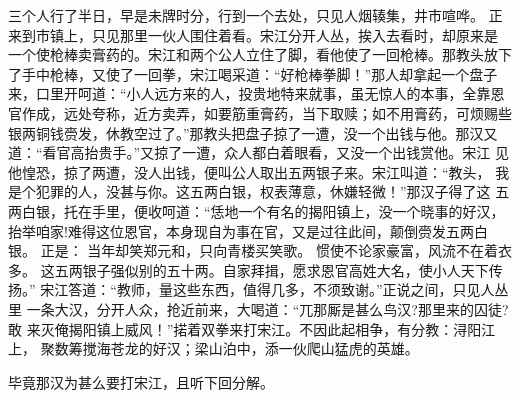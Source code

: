 三个人行了半日，早是未牌时分，行到一个去处，只见人烟辏集，井市喧哗。
正来到市镇上，只见那里一伙人围住着看。宋江分开人丛，挨入去看时，却原来是
一个使枪棒卖膏药的。宋江和两个公人立住了脚，看他使了一回枪棒。那教头放下
了手中枪棒，又使了一回拳，宋江喝采道：“好枪棒拳脚！”那人却拿起一个盘子
来，口里开呵道：“小人远方来的人，投贵地特来就事，虽无惊人的本事，全靠恩
官作成，远处夸称，近方卖弄，如要筋重膏药，当下取赎；如不用膏药，可烦赐些
银两铜钱赍发，休教空过了。”那教头把盘子掠了一遭，没一个出钱与他。那汉又
道：“看官高抬贵手。”又掠了一遭，众人都白着眼看，又没一个出钱赏他。宋江
见他惶恐，掠了两遭，没人出钱，便叫公人取出五两银子来。宋江叫道：“教头，
我是个犯罪的人，没甚与你。这五两白银，权表薄意，休嫌轻微！”那汉子得了这
五两白银，托在手里，便收呵道：“恁地一个有名的揭阳镇上，没一个晓事的好汉，
抬举咱家!难得这位恩官，本身现自为事在官，又是过往此间，颠倒赍发五两白银。
正是：
当年却笑郑元和，只向青楼买笑歌。
惯使不论家豪富，风流不在着衣多。
这五两银子强似别的五十两。自家拜揖，愿求恩官高姓大名，使小人天下传扬。”
宋江答道：“教师，量这些东西，值得几多，不须致谢。”正说之间，只见人丛里
一条大汉，分开人众，抢近前来，大喝道：“兀那厮是甚么鸟汉?那里来的囚徒?敢
来灭俺揭阳镇上威风！”掿着双拳来打宋江。不因此起相争，有分教：浔阳江上，
聚数筹搅海苍龙的好汉；梁山泊中，添一伙爬山猛虎的英雄。

毕竟那汉为甚么要打宋江，且听下回分解。